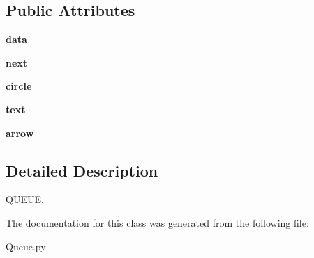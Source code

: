 \subsection*{Public Attributes}
\begin{DoxyCompactItemize}
\item 
\mbox{\label{class_queue_1_1_queue_node_aa9448b7ef31d8dd61adb504ccf7b1c44}} 
{\bfseries data}
\item 
\mbox{\label{class_queue_1_1_queue_node_a736cdbadd2c72609a9964dd149054db0}} 
{\bfseries next}
\item 
\mbox{\label{class_queue_1_1_queue_node_ac113a4d52ea51f0c6fcb65b30e6e0761}} 
{\bfseries circle}
\item 
\mbox{\label{class_queue_1_1_queue_node_a3e732e4728a03dd3c333782519efb320}} 
{\bfseries text}
\item 
\mbox{\label{class_queue_1_1_queue_node_a762acb0de1bf2321d766376c383ffbb0}} 
{\bfseries arrow}
\end{DoxyCompactItemize}


\subsection{Detailed Description}
Q\+U\+E\+UE. 

The documentation for this class was generated from the following file\+:\begin{DoxyCompactItemize}
\item 
Queue.\+py\end{DoxyCompactItemize}
